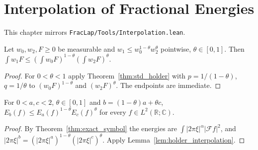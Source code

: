 \chapter{Interpolation of Fractional Energies}

This chapter mirrors \texttt{FracLap/Tools/Interpolation.lean}.

\begin{lemma}\label{lem:holder_interpolation}
\leanok
Let $w_0, w_2, F \ge 0$ be measurable and $w_1 \le w_0^{1-\theta} w_2^\theta$ pointwise, $\theta \in [0, 1]$. Then $\int w_1 F \le (\int w_0 F)^{1-\theta} (\int w_2 F)^\theta$.
\end{lemma}

\begin{proof}
\leanok
For $0 < \theta < 1$ apply Theorem~\ref{thm:std_holder} with $p = 1/(1-\theta)$, $q = 1/\theta$ to $(w_0 F)^{1-\theta}$ and $(w_2 F)^\theta$. The endpoints are immediate.
\end{proof}

\begin{theorem}\label{thm:energy_interpolation}
\leanok
For $0 < a, c < 2$, $\theta \in [0, 1]$ and $b = (1 - \theta) a + \theta c$, $E_b(f) \le E_a(f)^{1-\theta} E_c(f)^\theta$ for every $f \in L^2(\mathbb{R}; \mathbb{C})$.
\end{theorem}

\begin{proof}
\leanok
By Theorem~\ref{thm:exact_symbol} the energies are $\int \lvert 2\pi\xi \rvert^\alpha \lvert \mathcal{F} f \rvert^2$, and $\lvert 2\pi\xi \rvert^b = (\lvert 2\pi\xi \rvert^a)^{1-\theta} (\lvert 2\pi\xi \rvert^c)^\theta$. Apply Lemma~\ref{lem:holder_interpolation}.
\end{proof}
